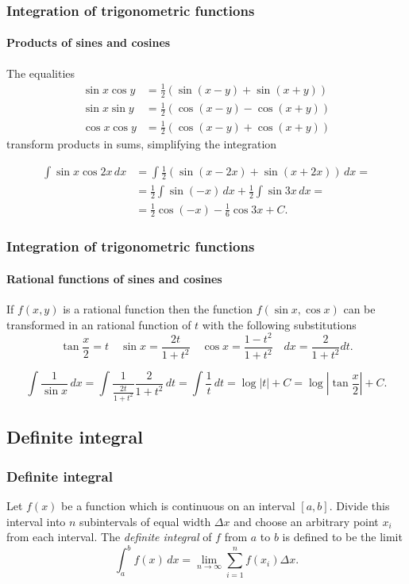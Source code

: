 \begin{frame}
\frametitle{Integration of trigonometric functions}
\framesubtitle{Products of sines and cosines}
The equalities 
\begin{align*}
\sin x\cos y &= \frac{1}{2}(\sin(x-y)+\sin(x+y))\\
\sin x\sin y &= \frac{1}{2}(\cos(x-y)-\cos(x+y))\\
\cos x\cos y &= \frac{1}{2}(\cos(x-y)+\cos(x+y))
\end{align*}
transform products in sums, simplifying the integration 

\begin{align*}
\int \sin x\cos 2x\, dx &= \int \frac{1}{2}(\sin(x-2x)+\sin(x+2x))\,dx = \\
&= \frac{1}{2}\int \sin (-x)\,dx +\frac{1}{2}\int \sin 3x\,dx = \\
&= \frac{1}{2}\cos(-x)- \frac{1}{6}\cos 3x +C.
\end{align*}
\end{frame}


\begin{frame}
\frametitle{Integration of trigonometric functions}
\framesubtitle{Rational functions of sines and cosines}
If $f(x,y)$ is a rational function then the function $f(\sin x,\cos x)$ can be transformed in an rational function of  
$t$ with the following substitutions
\[
\tan \frac{x}{2}=t \quad \sin x=\frac{2t}{1+t^2} \quad \cos x = \frac{1-t^2}{1+t^2} \quad dx = \frac{2}{1+t^2}dt. 
\]

\[
\int \frac{1}{\sin x}\,dx = \int \frac{1}{\frac{2t}{1+t^2}}\frac{2}{1+t^2}\,dt = \int \frac{1}{t}\,dt = \log|t|+C =
\log|\tan\frac{x}{2}|+C.
\]
\end{frame}



\subsection{Definite integral}
\begin{frame}
\frametitle{Definite integral}
\begin{definition}
Let $f(x)$ be a function which is continuous on an interval $[a, b]$.
Divide this interval into $n$ subintervals of equal width $\Delta x$ and choose an arbitrary point $x_i$ from each interval.
The \emph{definite integral} of $f$ from $a$ to $b$ is defined to be the limit
\[
\int_a^b f(x)\,dx = \lim_{n\rightarrow \infty}\sum_{i=1}^n f(x_i)\Delta x. 
\]
\end{definition}
\end{frame}


